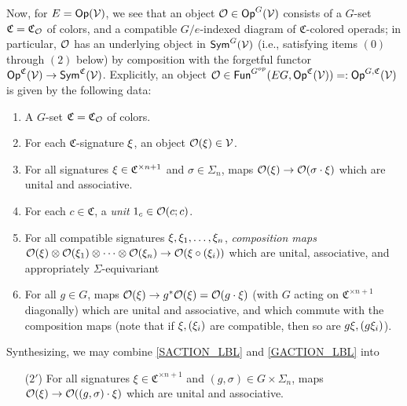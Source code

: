\documentclass[a4paper,10pt
,draft
]{article}%
\renewcommand{\1}{\eta}%
\begin{document}
\begin{example}
      Now, for $E = \mathsf{Op}(\mathcal V)$,
      we see that an object $\mathcal{O} \in \mathsf{Op}^G(\mathcal V)$ consists of
      a $G$-set $\mathfrak C = \mathfrak C_{\mathcal{O}}$ of colors, and a compatible $G/e$-indexed diagram of $\mathfrak C$-colored operads;
      in particular, $\mathcal{O}$ has an underlying object in $\mathsf{Sym}^G(\mathcal V)$
      (i.e., satisfying items $(0)$ through $(2)$ below)
      by composition with the forgetful functor $\mathsf{Op}^{\mathfrak C}(\mathcal V) \to \mathsf{Sym}^{\mathfrak C}(\mathcal V)$.
      Explicitly, an object $\mathcal{O} \in \mathsf{Fun}^{G^{op}}(E G, \mathsf{Op}^{\mathfrak C}(\mathcal V)) =: \mathsf{Op}^{G, \mathfrak C}(\mathcal V)$
      is given by the following data:
      \begin{enumerate}[label = (\arabic*), start = 0]
      \item A $G$-set $\mathfrak C = \mathfrak C_{\mathcal{O}}$ of colors.
      \item For each $\mathfrak C$-signature $\xi$, an object $\mathcal{O}(\xi) \in \mathcal V$.
      \item \label{SACTION_LBL}
            For all signatures $\xi \in \mathfrak C^{\times n + 1}$ and $\sigma \in \Sigma_n$,
            maps $\mathcal{O}(\xi) \to \mathcal{O}(\sigma \cdot \xi)$
            which are unital and associative.
      \item \label{GUNIT_LBL} 
            For each $c \in \mathfrak{C}$, a \textit{unit} $1_c \in \mathcal{O}(c;c)$.
      \item \label{COMP_LBL}
            For all compatible signatures $\xi, \xi_1,\dots, \xi_n$,
            \textit{composition maps} $\mathcal{O}(\xi) \otimes \mathcal{O}(\xi_1) \otimes \dots \otimes \mathcal{O}(\xi_n) \to \mathcal{O}(\xi \circ (\xi_i))$
            which are unital, associative, and appropriately $\Sigma$-equivariant
      \item \label{GACTION_LBL}
            For all $g \in G$, maps $\O(\ksi) \to g^{\**}\O(\ksi) = \O(g \cdot \ksi)$
            (with $G$ acting on $\mathfrak C^{\times n+1}$ diagonally)
            which are unital and associative, and which commute with the composition maps
            (note that if $\xi, (\xi_i)$ are compatible, then so are $g \xi, (g \xi_i)$).
      \end{enumerate}
      Synthesizing, we may combine \ref{SACTION_LBL} and \ref{GACTION_LBL} into
      \begin{enumerate}
      \item[($2'$)] For all signatures $\xi \in \mathfrak C^{\times n+1}$ and $(g,\sigma) \in G\times \Sigma_n$, maps
            $\mathcal{O}(\xi) \to \mathcal{O}((g,\sigma)\cdot \xi)$
            which are unital and associative.
      \end{enumerate}
      

\end{example}
\end{document}
